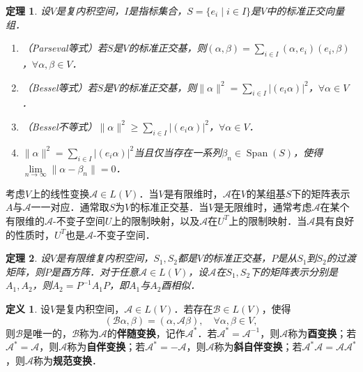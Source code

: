 \documentclass[a4paper,fontset=windows]{ctexbook}
\newtheorem{theorem}{定理}[chapter]
\theoremstyle{definition}
\newtheorem{definition}{定义}[chapter]
\DeclareMathOperator{\Span}{Span}
\renewcommand{\ge}{\geqslant}
\begin{document}
\begin{theorem}
设$V$是复内积空间，$I$是指标集合，$S=\{e_i\mid i\in I\}$是$V$中的标准正交向量组．
\begin{enumerate}
\item（{\rm Parseval等式}）若$S$是$V$的标准正交基，则$(\alpha,\beta)=\sum\limits_{i\in I}(\alpha,e_i)(e_i,\beta)$，$\forall\alpha,\beta\in V$．

\item（{\rm Bessel等式}）\hspace{11pt}若$S$是$V$的标准正交基，则$\|\alpha\|^2=\sum\limits_{i\in I}|(e_i\alpha)|^2$，$\forall\alpha\in V$．

\item（{\rm Bessel不等式}）$\|\alpha\|^2\ge\sum\limits_{i\in I}|(e_i\alpha)|^2$，$\forall\alpha\in V$．

\item $\|\alpha\|^2=\sum\limits_{i\in I}|(e_i\alpha)|^2$当且仅当存在一系列$\beta_n\in\Span(S)$，使得$\lim\limits_{n\to\infty}\|\alpha-\beta_n\|=0$．
\end{enumerate}
\end{theorem}

考虑$V$上的线性变换$\mathcal{A}\in L(V)$．当$V$是有限维时，$\mathcal{A}$在$V$的某组基$S$下的矩阵表示$A$与$\mathcal{A}$一一对应．通常取$S$为$V$的标准正交基．当$V$是无限维时，通常考虑$\mathcal{A}$在某个有限维的$\mathcal{A}$-不变子空间$U$上的限制映射，以及$\mathcal{A}$在$U^T$上的限制映射．当$\mathcal{A}$具有良好的性质时，$U^T$也是$\mathcal{A}$-不变子空间．

\begin{theorem}
设$V$是有限维复内积空间，$S_1,S_2$都是$V$的标准正交基，$P$是从$S_1$到$S_2$的过渡矩阵，则$P$是酉方阵．对于任意$\mathcal{A}\in L(V)$，设$\mathcal{A}$在$S_1,S_2$下的矩阵表示分别是$A_1,A_2$，则$A_2=P^{-1}A_1P$，即$A_1$与$A_2$酉相似．
\end{theorem}

\begin{definition}
设$V$是复内积空间，$\mathcal{A}\in L(V)$．若存在$\mathcal{B}\in L(V)$，使得
$$(\mathcal{B}\alpha,\beta)=(\alpha,\mathcal{A}\beta),\quad\forall\alpha,\beta\in V,$$
则$\mathcal{B}$是唯一的，$\mathcal{B}$称为$\mathcal{A}$的{\bf 伴随变换}，记作$\mathcal{A}^*$．若$\mathcal{A}^*=\mathcal{A}^{-1}$，则$\mathcal{A}$称为{\bf 酉变换}；若$\mathcal{A}^*=\mathcal{A}$，则$\mathcal{A}$称为{\bf 自伴变换}；若$\mathcal{A}^*=-\mathcal{A}$，则$\mathcal{A}$称为{\bf 斜自伴变换}；若$\mathcal{A}^*\mathcal{A}=\mathcal{A}\mathcal{A}^*$，则$\mathcal{A}$称为{\bf 规范变换}．
\end{definition}
\end{document}
